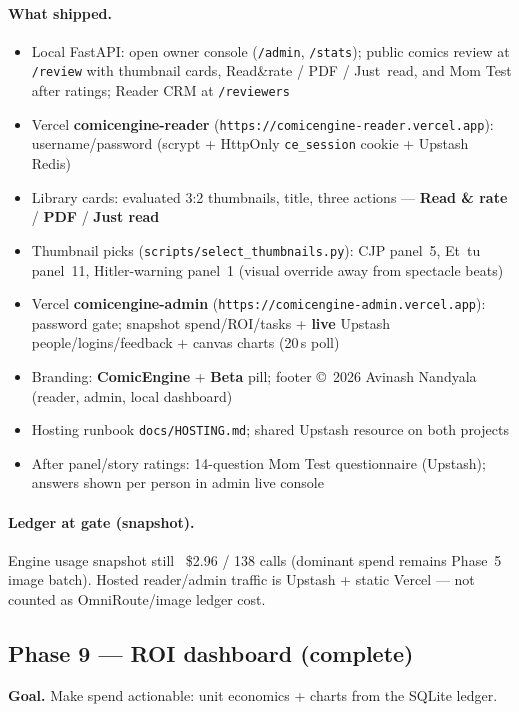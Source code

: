 \documentclass[10pt,twocolumn,letterpaper]{article}
\begin{document}
\paragraph{What shipped.}
\begin{itemize}[leftmargin=*,itemsep=1pt]
  \item Local FastAPI: open owner console (\texttt{/admin}, \texttt{/stats}); public comics review at \texttt{/review} with thumbnail cards, Read\&rate / PDF / Just~read, and Mom Test after ratings; Reader CRM at \texttt{/reviewers}
  \item Vercel \textbf{comicengine-reader} (\texttt{https://comicengine-reader.vercel.app}): username/password (scrypt + HttpOnly \texttt{ce\_session} cookie + Upstash Redis)
  \item Library cards: evaluated 3{:}2 thumbnails, title, three actions --- \textbf{Read \& rate} / \textbf{PDF} / \textbf{Just read}
  \item Thumbnail picks (\texttt{scripts/select\_thumbnails.py}): CJP panel~5, Et~tu panel~11, Hitler-warning panel~1 (visual override away from spectacle beats)
  \item Vercel \textbf{comicengine-admin} (\texttt{https://comicengine-admin.vercel.app}): password gate; snapshot spend/ROI/tasks + \textbf{live} Upstash people/logins/feedback + canvas charts (20\,s poll)
  \item Branding: \textbf{ComicEngine} + \textbf{Beta} pill; footer \copyright~2026 Avinash Nandyala (reader, admin, local dashboard)
  \item Hosting runbook \texttt{docs/HOSTING.md}; shared Upstash resource on both projects
  \item After panel/story ratings: 14-question Mom Test questionnaire (Upstash); answers shown per person in admin live console
\end{itemize}

\paragraph{Ledger at gate (snapshot).}
Engine usage snapshot still ~\$2.96 / 138 calls (dominant spend remains Phase~5 image batch). Hosted reader/admin traffic is Upstash + static Vercel --- not counted as OmniRoute/image ledger cost.


\subsection{Phase 9 --- ROI dashboard (complete)}
\textbf{Goal.} Make spend actionable: unit economics + charts from the SQLite ledger.
\end{document}
